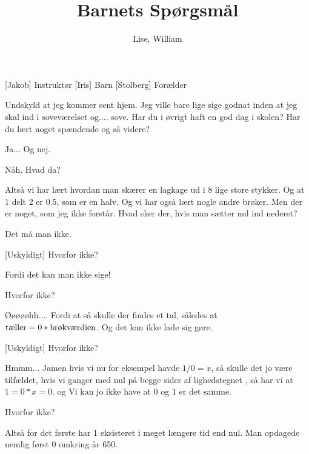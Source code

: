 \documentclass[a4paper,11pt]{article}
\title{Barnets Spørgsmål}
\author{Lise, William}
\begin{document}
\maketitle

\begin{roles}
[Jakob] Instruktør
[Iris] Barn
[Stolberg] Forælder
\end{roles}


  
\begin{sketch}

 Undskyld at jeg kommer sent hjem. Jeg ville bare lige sige godnat inden at jeg skal ind i
soveværelset og.... sove. Har du i øvrigt haft en god dag i skolen? Har du lært noget 
spændende og så videre?

 Ja... Og nej.

 Nåh. Hvad da?

 Altså vi har lært hvordan man skærer en lagkage ud i $8$ lige store stykker. Og at $1$ delt $2$ er $0.5$, som er en halv. Og vi har også lært nogle andre brøker. Men der er noget, som jeg ikke forstår. Hvad sker der, hvis man sætter nul ind nederst?

 Det må man ikke.

[Uskyldigt] Hvorfor ikke?

 Fordi det kan man ikke sige!

  Hvorfor ikke?

 Øøøøøhh.... Fordi at så skulle der findes et tal, således at $\textnormal{tæller}=0*\textnormal{brøkværdien}$. Og det kan ikke lade sig gøre. 

[Uskyldigt] Hvorfor ikke?

 Hmmm... Jamen hvis vi nu for eksempel havde $1/0=x$, så skulle det jo være tilfældet, hvis vi ganger med nul på begge sider af lighedstegnet , så har vi at $1=0*x=0$. og Vi kan jo ikke have at $0$ og $1$ er det samme. 

 Hvorfor ikke?

 Altså for det første har 1 eksisteret i meget længere tid end nul. Man opdagede nemlig først 0 omkring år 650. 


\end{sketch}
\end{document}
